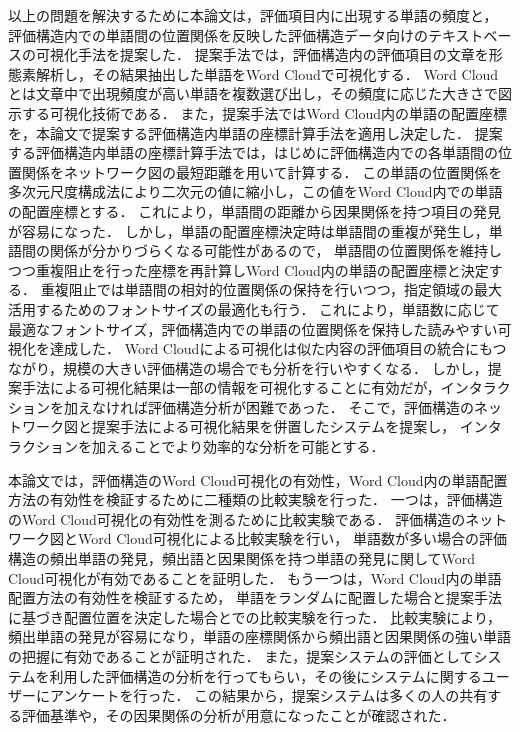 \documentclass[syuuron]{kuee}
\begin{document}
	以上の問題を解決するために本論文は，評価項目内に出現する単語の頻度と，
	評価構造内での単語間の位置関係を反映した評価構造データ向けのテキストベースの可視化手法を提案した．
	提案手法では，評価構造内の評価項目の文章を形態素解析し，その結果抽出した単語をWord Cloudで可視化する．
	Word Cloudとは文章中で出現頻度が高い単語を複数選び出し，その頻度に応じた大きさで図示する可視化技術である．
	また，提案手法ではWord Cloud内の単語の配置座標を，本論文で提案する評価構造内単語の座標計算手法を適用し決定した．
	提案する評価構造内単語の座標計算手法では，はじめに評価構造内での各単語間の位置関係をネットワーク図の最短距離を用いて計算する．
	この単語の位置関係を多次元尺度構成法により二次元の値に縮小し，この値をWord Cloud内での単語の配置座標とする．
	これにより，単語間の距離から因果関係を持つ項目の発見が容易になった．
	しかし，単語の配置座標決定時は単語間の重複が発生し，単語間の関係が分かりづらくなる可能性があるので，
	単語間の位置関係を維持しつつ重複阻止を行った座標を再計算しWord Cloud内の単語の配置座標と決定する．
	重複阻止では単語間の相対的位置関係の保持を行いつつ，指定領域の最大活用するためのフォントサイズの最適化も行う．
	これにより，単語数に応じて最適なフォントサイズ，評価構造内での単語の位置関係を保持した読みやすい可視化を達成した．
	Word Cloudによる可視化は似た内容の評価項目の統合にもつながり，規模の大きい評価構造の場合でも分析を行いやすくなる．
	しかし，提案手法による可視化結果は一部の情報を可視化することに有効だが，インタラクションを加えなければ評価構造分析が困難であった．
	そこで，評価構造のネットワーク図と提案手法による可視化結果を併置したシステムを提案し，
	インタラクションを加えることでより効率的な分析を可能とする．

	本論文では，評価構造のWord Cloud可視化の有効性，Word Cloud内の単語配置方法の有効性を検証するために二種類の比較実験を行った．
	一つは，評価構造のWord Cloud可視化の有効性を測るために比較実験である． 
	評価構造のネットワーク図とWord Cloud可視化による比較実験を行い，
	単語数が多い場合の評価構造の頻出単語の発見，頻出語と因果関係を持つ単語の発見に関してWord Cloud可視化が有効であることを証明した．
	もう一つは，Word Cloud内の単語配置方法の有効性を検証するため，
	単語をランダムに配置した場合と提案手法に基づき配置位置を決定した場合とでの比較実験を行った．
	比較実験により，頻出単語の発見が容易になり，単語の座標関係から頻出語と因果関係の強い単語の把握に有効であることが証明された．
	また，提案システムの評価としてシステムを利用した評価構造の分析を行ってもらい，その後にシステムに関するユーザーにアンケートを行った．
	この結果から，提案システムは多くの人の共有する評価基準や，その因果関係の分析が用意になったことが確認された．
\end{document}
